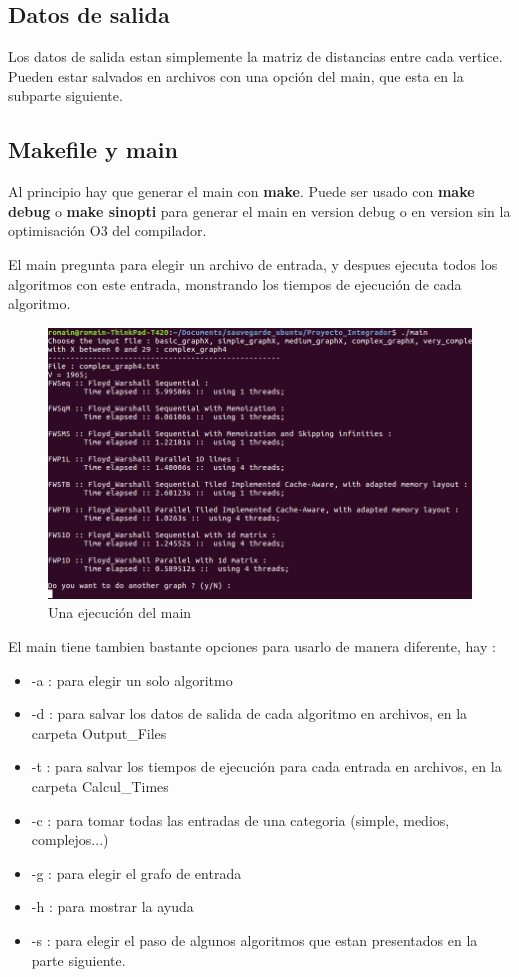 \documentclass[a4paper,11pt]{article}
\begin{document}
\subsection{Datos de salida}

Los datos de salida estan simplemente la matriz de distancias entre cada vertice. Pueden estar salvados en archivos con una opción del main, que esta en la subparte siguiente.

\subsection{Makefile y main}

Al principio hay que generar el main con \textbf{make}. Puede ser usado con \textbf{make debug} o \textbf{make sinopti} para generar el main en version debug o en version sin la optimisación O3 del compilador.

El main pregunta para elegir un archivo de entrada, y despues ejecuta todos los algoritmos con este entrada, monstrando los tiempos de ejecución de cada algoritmo.

\begin{figure}[H]
\begin{center}
  \includegraphics[scale=0.7]{main.png}
  \caption{Una ejecución del main}
\end{center}
\end{figure}

\noindent El main tiene tambien bastante opciones para usarlo de manera diferente, hay :

\begin{itemize}
    \item -a : para elegir un solo algoritmo
    \item -d : para salvar los datos de salida de cada algoritmo en archivos, en la carpeta Output\_Files
    \item -t : para salvar los tiempos de ejecución para cada entrada en archivos, en la carpeta Calcul\_Times
    \item -c : para tomar todas las entradas de una categoria (simple, medios, complejos...)
    \item -g : para elegir el grafo de entrada
    \item -h : para mostrar la ayuda
    \item -s : para elegir el paso de algunos algoritmos que estan presentados en la parte siguiente.
\end{itemize}
\end{document}
